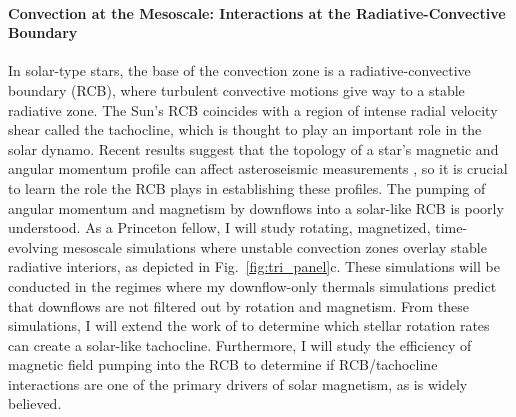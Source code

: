 \documentclass[onecolumn, hmargin=1in, vmargin=1in]{aastex62}
\begin{document}
\paragraph{Convection at the Mesoscale: Interactions at the Radiative-Convective Boundary}
In solar-type stars, the base of the convection zone is a radiative-convective boundary (RCB), where turbulent convective motions give way to a stable radiative zone.
The Sun's RCB coincides with a region of intense radial velocity shear called the tachocline, which is thought to play an important role in the solar dynamo.
Recent results suggest that the topology of a star's magnetic and angular momentum profile can affect asteroseismic measurements \citep{benomar&all2018, santos&all2018}, so it is crucial to learn the role the RCB plays in establishing these profiles.
The pumping of angular momentum and magnetism by downflows into a solar-like RCB is poorly understood.
As a Princeton fellow, I will study rotating, magnetized, time-evolving mesoscale simulations where unstable convection zones overlay stable radiative interiors, as depicted in Fig.~\ref{fig:tri_panel}c.
These simulations will be conducted in the regimes where my downflow-only thermals simulations predict that downflows are not filtered out by rotation and magnetism.
From these simulations, I will extend the work of \citet{wood&brummell2018} to determine which stellar rotation rates can create a solar-like tachocline.
Furthermore, I will study the efficiency of magnetic field pumping into the RCB to determine if RCB/tachocline interactions are one of the primary drivers of solar magnetism, as is widely believed.
\end{document}
